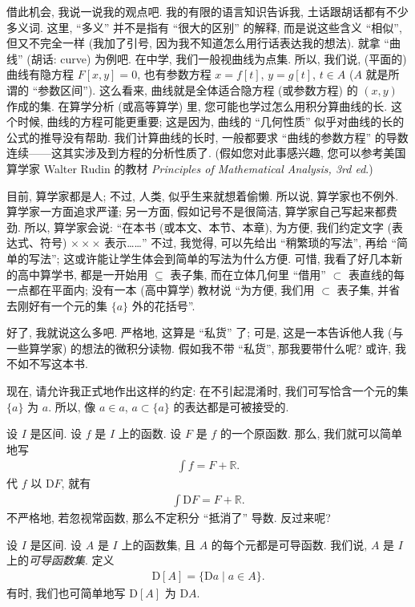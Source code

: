 借此机会, 我说一说我的观点吧. 我的有限的语言知识告诉我, 土话跟胡话都有不少多义词. 这里, ``多义'' 并不是指有 ``很大的区别'' 的解释, 而是说这些含义 ``相似'', 但又不完全一样 (我加了引号, 因为我不知道怎么用行话表达我的想法). 就拿 ``曲线'' (胡话: curve) 为例吧. 在中学, 我们一般视曲线为点集. 所以, 我们说, (平面的) 曲线有隐方程 $F[x, y] = 0$, 也有参数方程 $x = f[t]$, $y = g[t]$, $t \in A$ ($A$ 就是所谓的 ``参数区间''). 这么看来, 曲线就是全体适合隐方程 (或参数方程) 的 $(x, y)$ 作成的集. 在算学分析 (或高等算学) 里, 您可能也学过怎么用积分算曲线的长. 这个时候, 曲线的方程可能更重要; 这是因为, 曲线的 ``几何性质'' 似乎对曲线的长的公式的推导没有帮助. 我们计算曲线的长时, 一般都要求 ``曲线的参数方程'' 的导数连续——这其实涉及到方程的分析性质了. (假如您对此事感兴趣, 您可以参考美国算学家 Walter Rudin 的教材 \textit{Principles of Mathematical Analysis, 3rd ed}.)

目前, 算学家都是人; 不过, 人类, 似乎生来就想着偷懒. 所以说, 算学家也不例外. 算学家一方面追求严谨; 另一方面, 假如记号不是很简洁, 算学家自己写起来都费劲. 所以, 算学家会说: ``在本书 (或本文、本节、本章), 为方便, 我们约定文字 (表达式、符号) $\times \times \times$ 表示……'' 不过, 我觉得, 可以先给出 ``稍繁琐的写法'', 再给 ``简单的写法''; 这或许能让学生体会到简单的写法为什么方便. 可惜, 我看了好几本新的高中算学书, 都是一开始用 $\subseteq$ 表子集, 而在立体几何里 ``借用'' $\subset$ 表直线的每一点都在平面内; 没有一本 (高中算学) 教材说 ``为方便, 我们用 $\subset$ 表子集, 并省去刚好有一个元的集 $\{ a \}$ 外的花括号''.

好了, 我就说这么多吧. 严格地, 这算是 ``私货'' 了; 可是, 这是一本告诉他人我 (与一些算学家) 的想法的微积分读物. 假如我不带 ``私货'', 那我要带什么呢? 或许, 我不如不写这本书.

现在, 请允许我正式地作出这样的约定: 在不引起混淆时, 我们可写恰含一个元的集 $\{ a \}$ 为 $a$. 所以, 像 $a \in a$, $a \subset \{ a \}$ 的表达都是可被接受的.

设 $I$ 是区间. 设 $f$ 是 $I$ 上的函数. 设 $F$ 是 $f$ 的一个原函数. 那么, 我们就可以简单地写
\begin{align*}
    \int {f} = F + \mathbb{R}.
\end{align*}
代 $f$ 以 $\mathrm{D}F$, 就有
\begin{align*}
    \int {\mathrm{D}F} = F + \mathbb{R}.
\end{align*}
不严格地, 若忽视常函数, 那么不定积分 ``抵消了'' 导数. 反过来呢?

\begin{definition}
    设 $I$ 是区间. 设 $A$ 是 $I$ 上的函数集, 且 $A$ 的每个元都是可导函数. 我们说, $A$ 是 $I$ 上的\emph{可导函数集}. 定义
    \begin{align*}
        \mathrm{D} [A] = \{ \mathrm{D}a \mid a \in A \}.
    \end{align*}
    有时, 我们也可简单地写 $\mathrm{D}[A]$ 为 $\mathrm{D}A$.
\end{definition}

